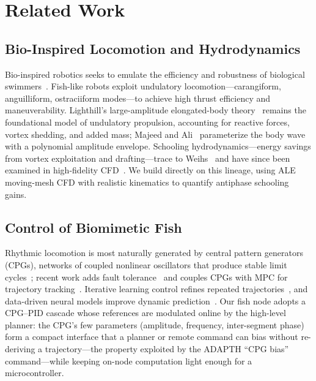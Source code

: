 \documentclass[journal]{IEEEtran}
\begin{document}
\section{Related Work}
\label{sec:related}

\subsection{Bio-Inspired Locomotion and Hydrodynamics}
Bio-inspired robotics seeks to emulate the efficiency and robustness of
biological swimmers~\cite{triantafyllou2000hydrodynamics,sfakiotakis1999review}.
Fish-like robots exploit undulatory locomotion---carangiform, anguilliform,
ostraciiform modes---to achieve high thrust efficiency and maneuverability.
Lighthill's large-amplitude elongated-body theory~\cite{lighthill1971large}
remains the foundational model of undulatory propulsion, accounting for reactive
forces, vortex shedding, and added mass; Majeed and Ali~\cite{majeed2014dynamic}
parameterize the body wave with a polynomial amplitude envelope. Schooling
hydrodynamics---energy savings from vortex exploitation and drafting---trace to
Weihs~\cite{weihs1973hydromechanics} and have since been examined in high-fidelity
CFD~\cite{borazjani2008numerical,daghooghi2015hydrodynamic,koca2025comparative,kern2006simulations}.
We build directly on this lineage, using ALE moving-mesh CFD with realistic
kinematics to quantify antiphase schooling gains.

\subsection{Control of Biomimetic Fish}
Rhythmic locomotion is most naturally generated by central pattern generators
(CPGs), networks of coupled nonlinear oscillators that produce stable limit
cycles~\cite{xie2019cpg}; recent work adds fault tolerance~\cite{wang2025fuzzy}
and couples CPGs with MPC for trajectory tracking~\cite{yan2022bionic}.
Iterative learning control refines repeated trajectories~\cite{wang2020iterative},
and data-driven neural models improve dynamic
prediction~\cite{zhong2026datadriven}. Our fish node adopts a CPG--PID cascade
whose references are modulated online by the high-level planner: the CPG's few
parameters (amplitude, frequency, inter-segment phase) form a compact interface
that a planner or remote command can bias without re-deriving a trajectory---the
property exploited by the ADAPTH ``CPG bias'' command---while keeping on-node
computation light enough for a microcontroller.
\end{document}
